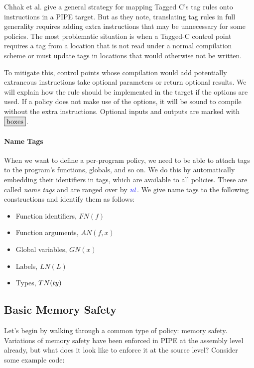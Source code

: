 \documentclass{llncs}
\begin{document}
Chhak et al. \cite{Chhak21:Tagine} give a general strategy for mapping Tagged C's tag rules
onto instructions in a PIPE target. But as they note, translating tag rules in full generality
requires adding extra instructions that may be unnecessary for some policies. The most problematic
situation is when a Tagged-C control point requires a tag from a location that is not read under
a normal compilation scheme or must update tags in locations that would otherwise not be written.

To mitigate this, control points whose compilation would add potentially extraneous instructions
take optional parameters or return optional results. We will explain how the rule should be
implemented in the target if the options are used. If a policy does not make use of the options, it will
be sound to compile without the extra instructions. Optional inputs
and outputs are marked with \(\optional{boxes}\).

\paragraph*{Name Tags}

When we want to define a per-program policy, we need to be able to attach tags to the program's
functions, globals, and so on. We do this by automatically embedding their identifiers in tags,
which are available to all policies. These are called {\em name tags} and are ranged over by
\(\mathit{\color{blue} nt}\). We give name tags to the following constructions and identify them as follows:
\begin{itemize}
\item Function identifiers, \(FN(f)\)
\item Function arguments, \(AN(f,x)\)
\item Global variables, \(GN(x)\)
\item Labels, \(LN(L)\)
\item Types, \(TN(ty)\)
\end{itemize}

\subsection{Basic Memory Safety}
\label{sec:memsafe}

Let's begin by walking through a common type of policy: memory safety. Variations of memory safety
have been enforced in PIPE at the assembly level already, but what does it look like to enforce it
at the source level? Consider some example code:
\end{document}
